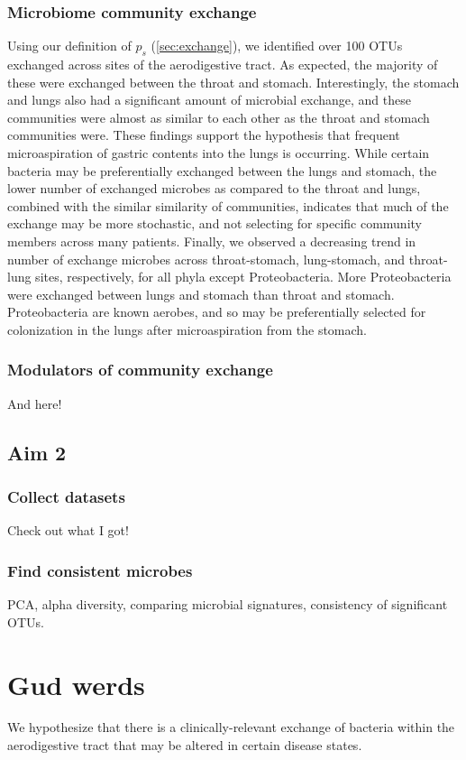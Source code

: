 \documentclass[12pt]{article}
\begin{document}
\subsubsection{Microbiome community exchange}
Using our definition of $p_s$ (\ref{sec:exchange}), we identified over 100
OTUs exchanged across sites of the aerodigestive tract.
As expected, the majority of these were exchanged between the throat and stomach.
Interestingly, the stomach and lungs also had a significant
amount of microbial exchange, and these communities were almost as similar to
each other as the throat and stomach communities were. 
These findings support the hypothesis that frequent microaspiration
of gastric contents into the lungs is occurring. While certain bacteria
may be preferentially exchanged between the lungs and stomach, the lower 
number of exchanged microbes as compared to the throat and lungs, combined with
the similar similarity of communities, indicates that much of the exchange may
be more stochastic, and not selecting for specific community members
across many patients.
Finally, we observed a decreasing trend in number of exchange microbes 
across throat-stomach, lung-stomach, and throat-lung sites, respectively, 
for all phyla except Proteobacteria. More Proteobacteria were exchanged 
between lungs and stomach than throat and stomach. Proteobacteria are 
known aerobes, and so may be preferentially selected for colonization in 
the lungs after microaspiration from the stomach.

\subsubsection{Modulators of community exchange}
And here!

\subsection{Aim 2}
\subsubsection{Collect datasets}
Check out what I got!

\subsubsection{Find consistent microbes}
PCA, alpha diversity, comparing microbial signatures, consistency of significant OTUs.

\section{Gud werds}
We hypothesize that there is a clinically-relevant exchange of bacteria within the aerodigestive tract that may be altered in certain disease states. 
\end{document}

